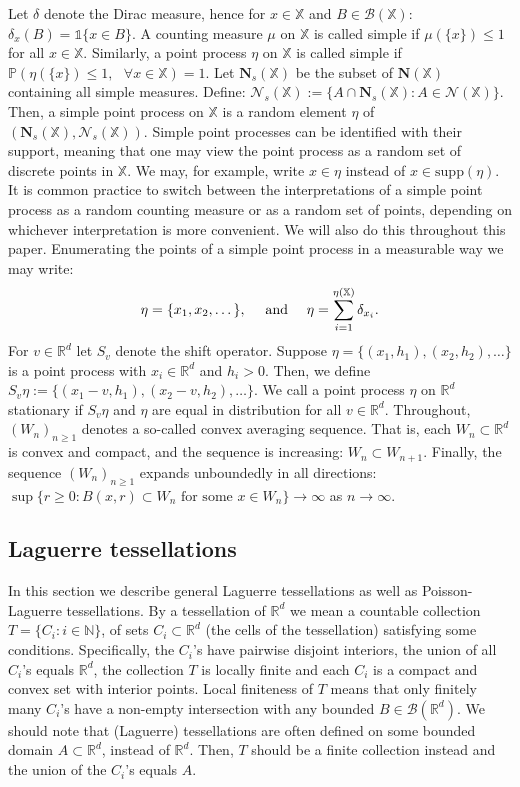 \documentclass{article}
\newcommand{\NN}{\mathbb{N}}
\newcommand{\RR}{\mathbb{R}}
\newcommand{\PP}{\mathbb{P}}
\theoremstyle{plain}
\theoremstyle{remark}
\theoremstyle{definition}
\begin{document}
Let $\delta$ denote the Dirac measure, hence for $x \in \mathbb{X}$ and $B \in \mathcal{B}(\mathbb{X})$: $\delta_x(B) = \mathds{1}\{x \in B\}$. A counting measure $\mu$ on $\mathbb{X}$ is called simple if $\mu(\{x\}) \leq 1$ for all $x \in \mathbb{X}$. Similarly, a point process $\eta$ on $\mathbb{X}$ is called simple if $\PP\left(\eta(\{x\}) \leq 1, \text{ } \forall x \in \mathbb{X} \right) = 1$. Let $\mathbf{N}_s(\mathbb{X})$ be the subset of $\mathbf{N}(\mathbb{X})$ containing all simple measures. Define: $\mathcal{N}_s(\mathbb{X}):= \{A \cap \mathbf{N}_s(\mathbb{X}): A \in \mathcal{N}(\mathbb{X})\}$. Then, a simple point process on $\mathbb{X}$ is a random element $\eta$ of $(\mathbf{N}_s(\mathbb{X}), \mathcal{N}_s(\mathbb{X}))$. Simple point processes can be identified with their support, meaning that one may view the point process as a random set of discrete points in $\mathbb{X}$. We may, for example, write $x \in \eta$ instead of $x \in \mathrm{supp}(\eta)$. It is common practice to switch between the interpretations of a simple point process as a random counting measure or as a random set of points, depending on whichever interpretation is more convenient. We will also do this throughout this paper. Enumerating the points of a simple point process in a measurable way we may write:
\[\eta = \{x_1,x_2,\dots\}, \text{ \quad and \quad } \eta = \sum_{i =1}^{\eta(\mathbb{X})}\delta_{x_i}.\]
For $v \in \RR^d$ let $S_v$ denote the shift operator. Suppose $\eta = \{(x_1,h_1), (x_2, h_2),\dots\}$ is a point process with $x_i \in \RR^d$ and $h_i > 0$. Then, we define $S_v\eta := \{(x_1-v,h_1),(x_2-v,h_2),\dots\}$. We call a point process $\eta$ on $\RR^d$ stationary if $S_v\eta$ and $\eta$ are equal in distribution for all $v \in \RR^d$. Throughout, $(W_n)_{n \geq 1}$ denotes a so-called convex averaging sequence. That is, each $W_n \subset \RR^d$ is convex and compact, and the sequence is increasing: $W_n \subset W_{n+1}$. Finally, the sequence $(W_n)_{n \geq 1}$ expands unboundedly in all directions: $\sup\{r \geq 0: B(x,r) \subset W_n \text{ for some } x \in W_n\} \to \infty$ as $n \to \infty$.

\subsection{Laguerre tessellations} \label{prelim_laguerre}
In this section we describe general Laguerre tessellations as well as Poisson-Laguerre tessellations. By a tessellation of $\RR^d$ we mean a countable collection $T = \{C_i: i\in \NN\}$, of sets $C_i \subset \RR^d$ (the cells of the tessellation) satisfying some conditions. Specifically, the $C_i$'s have pairwise disjoint interiors, the union of all $C_i$'s equals $\RR^d$, the collection $T$ is locally finite and each $C_i$ is a compact and convex set with interior points. Local finiteness of $T$ means that only finitely many $C_i$'s have a non-empty intersection with any bounded $B \in \mathcal{B}(\RR^d)$. We should note that (Laguerre) tessellations are often defined on some bounded domain $A \subset \RR^d$, instead of $\RR^d$. Then, $T$ should be a finite collection instead and the union of the $C_i$'s equals $A$.
\end{document}
